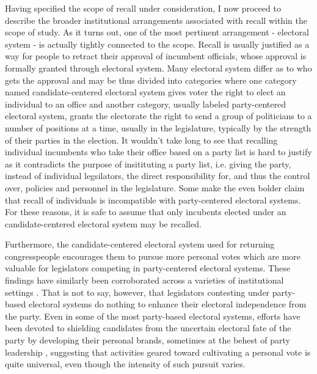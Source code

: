 \documentclass[hyphens, crop=false]{standalone}
\begin{document}
		
		Having specified the scope of recall under consideration,
		I now proceed to describe the broader institutional arrangements associated with recall within the scope of study.
		As it turns out,
		one of
		the most pertinent arrangement
		- electoral system -
		is actually tightly connected to the scope.
		Recall is usually justified as a way for people to retract their approval of incumbent officials,
		whose approval is formally granted through electoral system.
		Many electoral system differ as to who gets the approval
		and
		may be thus divided into categories where
		one category named candidate-centered electoral system gives voter the right to elect an individual to an office
		and
		another category, usually labeled party-centered electoral system, grants the electorate the right to send a group of politicians to
		a number of positions at a time, usually in the legislature,
		typically by the strength of their parties in the election.
		It wouldn't take long to see that recalling individual incumbents who take their office based on a party list is hard to justify
		as it contradicts the purpose of insitituting a party list, i.e. giving the party,
		instead of individual legsilators,
		the direct responsibility for, and thus the control over, policies and personnel in the legislature.
		Some make the even bolder claim that recall of individuals is incompatible with party-centered electoral systems.
		For these reasons, it is safe to assume that only incubents elected under an candidate-centered electoral system may be recalled.
	
		Furthermore,
		the candidate-centered electoral system used for returning congresspeople encourages them to pursue more personal votes which are more valuable for legislators competing in party-centered electoral systems.
		These findings have similarly been corroborated across a varieties of institutional settings
		\autocite{careyIncentivesCultivatePersonal1995}.
		That is not to say,
		however,
		that legislators contesting under party-based electoral systems do nothing to enhance their electoral independence from the party.
		Even in some of the most party-based electoral systems,
		efforts have been devoted to shielding candidates from the uncertain electoral fate of the party by developing their personal brands,
		sometimes at the behest of party leadership
		\autocite{shugartLookingLocalsVoter2005},
		suggesting that activities geared toward cultivating a personal vote is quite universal,
		even though the intensity of such pursuit varies.
		
		
		
	
	
\end{document}
